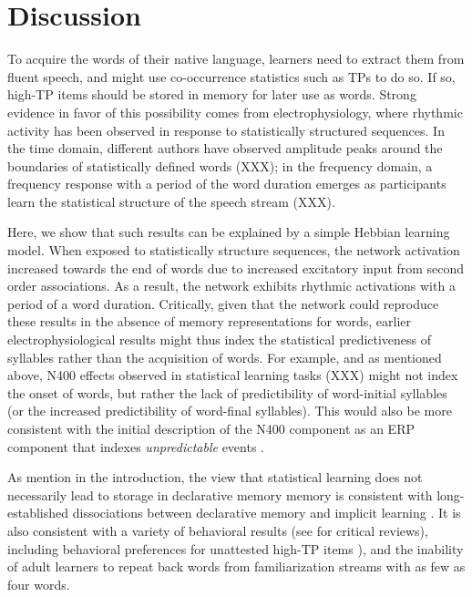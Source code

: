 \documentclass[
]{article}
\begin{document}
\clearpage

\hypertarget{discussion}{%
\section{Discussion}\label{discussion}}

To acquire the words of their native language, learners need to extract
them from fluent speech, and might use co-occurrence statistics such as
TPs to do so. If so, high-TP items should be stored in memory for later
use as words. Strong evidence in favor of this possibility comes from
electrophysiology, where rhythmic activity has been observed in response
to statistically structured sequences. In the time domain, different
authors have observed amplitude peaks around the boundaries of
statistically defined words (XXX); in the frequency domain, a frequency
response with a period of the word duration emerges as participants
learn the statistical structure of the speech stream (XXX).

Here, we show that such results can be explained by a simple Hebbian
learning model. When exposed to statistically structure sequences, the
network activation increased towards the end of words due to increased
excitatory input from second order associations. As a result, the
network exhibits rhythmic activations with a period of a word duration.
Critically, given that the network could reproduce these results in the
absence of memory representations for words, earlier
electrophysiological results might thus index the statistical
predictiveness of syllables rather than the acquisition of words. For
example, and as mentioned above, N400 effects observed in statistical
learning tasks (XXX) might not index the onset of words, but rather the
lack of predictibility of word-initial syllables (or the increased
predictibility of word-final syllables). This would also be more
consistent with the initial description of the N400 component as an ERP
component that indexes \emph{unpredictable} events \citep{Kutas2000}.

As mention in the introduction, the view that statistical learning does
not necessarily lead to storage in declarative memory memory is
consistent with long-established dissociations between declarative
memory and implicit learning
\citetext{\citealp{Cohen1980}; \citealp{Finn2016}; \citealp[\citet{Knowlton1996a}]{Graf1984}; \citealp{Poldrack2001}; \citealp{Squire1992}}.
It is also consistent with a variety of behavioral results (see
\citep[\citet{Endress-stat-recall}]{Endress2020} for critical reviews),
including behavioral preferences for unattested high-TP items
\citep{Endress-Action-Axc, Endress-Phantoms-Vision, Endress-Phantoms, Jones2007, Turk-Browne-reversal}),
and the inability of adult learners to repeat back words from
familiarization streams with as few as four
words\citep{Endress-stat-recall}.
\end{document}
